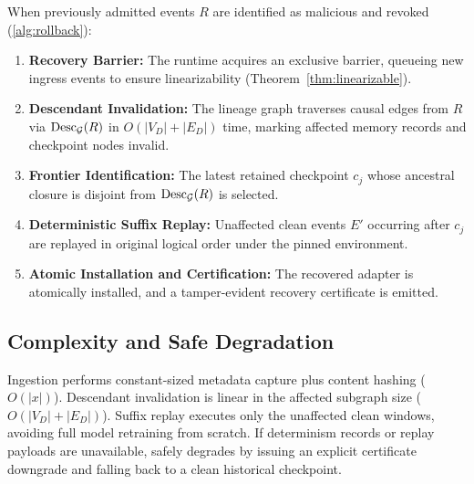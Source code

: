 When previously admitted events $R$ are identified as malicious and revoked (\cref{alg:rollback}):
\begin{enumerate}[leftmargin=*,itemsep=1pt]
  \item \textbf{Recovery Barrier:} The runtime acquires an exclusive barrier, queueing new ingress events to ensure linearizability (Theorem~\ref{thm:linearizable}).
  \item \textbf{Descendant Invalidation:} The lineage graph traverses causal edges from $R$ via $\operatorname{Desc}_{\mathcal{G}}(R)$ in $O(|V_D|+|E_D|)$ time, marking affected memory records and checkpoint nodes invalid.
  \item \textbf{Frontier Identification:} The latest retained checkpoint $c_j$ whose ancestral closure is disjoint from $\operatorname{Desc}_{\mathcal{G}}(R)$ is selected.
  \item \textbf{Deterministic Suffix Replay:} Unaffected clean events $E'$ occurring after $c_j$ are replayed in original logical order under the pinned environment.
  \item \textbf{Atomic Installation and Certification:} The recovered adapter is atomically installed, and a tamper-evident recovery certificate is emitted.
\end{enumerate}

\subsection{Complexity and Safe Degradation}

Ingestion performs constant-sized metadata capture plus content hashing ($O(|x|)$). Descendant invalidation is linear in the affected subgraph size ($O(|V_D|+|E_D|)$). Suffix replay executes only the unaffected clean windows, avoiding full model retraining from scratch. If determinism records or replay payloads are unavailable, \PG{} safely degrades by issuing an explicit certificate downgrade and falling back to a clean historical checkpoint.
